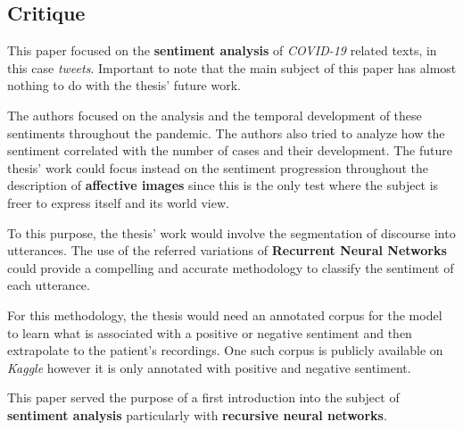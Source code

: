 \documentclass{Paper_Summary}
\begin{document}
\makepapertitle

\breakline

\begin{center}
    \section*{Critique}
\end{center}

    This paper focused on the \textbf{sentiment analysis} of \emph{COVID-19} related texts, in this case \emph{tweets}. Important to note that the main subject of this paper has almost nothing to do with the thesis' future work.

    The authors focused on the analysis and the temporal development of these sentiments throughout the pandemic. The authors also tried to analyze how the sentiment correlated with the number of cases and their development. The future thesis' work could focus instead on the sentiment progression throughout the description of \textbf{affective images} since this is the only test where the subject is freer to express itself and its world view.

    To this purpose, the thesis' work would involve the segmentation of discourse into utterances. The use of the referred variations of \textbf{Recurrent Neural Networks} could provide a compelling and accurate methodology to classify the sentiment of each utterance.

    For this methodology, the thesis would need an annotated corpus for the model to learn what is associated with a positive or negative sentiment and then extrapolate to the patient's recordings. One such corpus is publicly available on \emph{Kaggle} however it is only annotated with positive and negative sentiment.

    This paper served the purpose of a first introduction into the subject of \textbf{sentiment analysis} particularly with \textbf{recursive neural networks}.

    \vspace{-5mm}

\breakline
\end{document}
